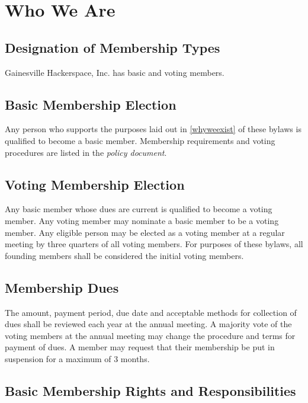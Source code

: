 \documentclass[10pt,letterpaper,titlepage]{article}
\newcommand\corpname{Gainesville Hackerspace, Inc.}
\begin{document}
\section{Who We Are}

\subsection{Designation of Membership Types}

\corpname{} has basic and voting members.

\subsection{Basic Membership Election}

Any person who supports the purposes laid out in \ref{whyweexist} of
these bylaws is qualified to become a basic member. Membership requirements and 
voting procedures are listed in the \emph{policy document}.


\subsection{Voting Membership Election}

Any basic member whose dues are current is qualified to become a voting
member. Any voting member may nominate a basic member to be a voting
member. Any eligible person may be elected as a voting member at a
regular meeting by three quarters of all voting members.
For purposes of these bylaws, all founding members shall be considered
the initial voting members.


\subsection{Membership Dues}
\label{votmemdue}

The amount, payment period, due date and acceptable methods for collection of
dues shall be reviewed each year at the annual meeting.
A majority vote of the voting members at the annual meeting may change the procedure
and terms for payment of dues.
A member may request that their membership be put in suspension for a maximum
of 3 months.

\subsection{Basic Membership Rights and Responsibilities}
\end{document}
